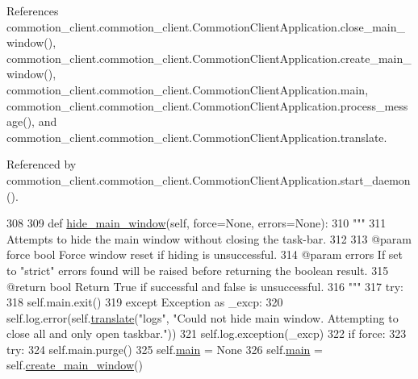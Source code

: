 References commotion\+\_\+client.\+commotion\+\_\+client.\+Commotion\+Client\+Application.\+close\+\_\+main\+\_\+window(), commotion\+\_\+client.\+commotion\+\_\+client.\+Commotion\+Client\+Application.\+create\+\_\+main\+\_\+window(), commotion\+\_\+client.\+commotion\+\_\+client.\+Commotion\+Client\+Application.\+main, commotion\+\_\+client.\+commotion\+\_\+client.\+Commotion\+Client\+Application.\+process\+\_\+message(), and commotion\+\_\+client.\+commotion\+\_\+client.\+Commotion\+Client\+Application.\+translate.



Referenced by commotion\+\_\+client.\+commotion\+\_\+client.\+Commotion\+Client\+Application.\+start\+\_\+daemon().


\begin{DoxyCode}
308 
309     \textcolor{keyword}{def }\hyperlink{classcommotion__client_1_1commotion__client_1_1CommotionClientApplication_a6b8f22fc6aaab6e6105f7832a7bf11b9}{hide\_main\_window}(self, force=None, errors=None):
310         \textcolor{stringliteral}{"""}
311 \textcolor{stringliteral}{        Attempts to hide the main window without closing the task-bar.}
312 \textcolor{stringliteral}{}
313 \textcolor{stringliteral}{        @param force bool Force window reset if hiding is unsuccessful.}
314 \textcolor{stringliteral}{        @param errors If set to "strict" errors found will be raised before returning the boolean result.}
315 \textcolor{stringliteral}{        @return bool Return True if successful and false is unsuccessful.}
316 \textcolor{stringliteral}{        """}
317         \textcolor{keywordflow}{try}:
318             self.main.exit()
319         \textcolor{keywordflow}{except} Exception \textcolor{keyword}{as} \_excp:
320             self.log.error(self.\hyperlink{classcommotion__client_1_1commotion__client_1_1CommotionClientApplication_a57e951c9b241fb0e0c70055b4ca1b6f7}{translate}(\textcolor{stringliteral}{"logs"}, \textcolor{stringliteral}{"Could not hide main window. Attempting to close
       all and only open taskbar."}))
321             self.log.exception(\_excp)
322             \textcolor{keywordflow}{if} force:
323                 \textcolor{keywordflow}{try}:
324                     self.main.purge()
325                     self.\hyperlink{classcommotion__client_1_1commotion__client_1_1CommotionClientApplication_a4ae692cf60dc0a935cf2e8a72f657d1a}{main} = \textcolor{keywordtype}{None}
326                     self.\hyperlink{classcommotion__client_1_1commotion__client_1_1CommotionClientApplication_a4ae692cf60dc0a935cf2e8a72f657d1a}{main} = self.\hyperlink{classcommotion__client_1_1commotion__client_1_1CommotionClientApplication_a726949d610a2bd566d1f3745b74c7b42}{create\_main\_window}()

\end{DoxyCode}
